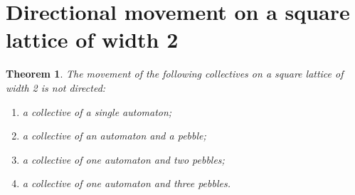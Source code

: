 \documentclass{article}
\newtheorem{theorem}{Theorem}
\begin{document}
\section{Directional movement on a square lattice of width 2}

\begin{theorem}
The movement of the following collectives on a square lattice of width 2 is not directed:
\begin{enumerate}
\item a collective of a single automaton;
\item a collective of an automaton and a pebble;
\item a collective of one automaton and two pebbles;
\item a collective of one automaton and three pebbles.
\end{enumerate}
\end{theorem}
\end{document}
